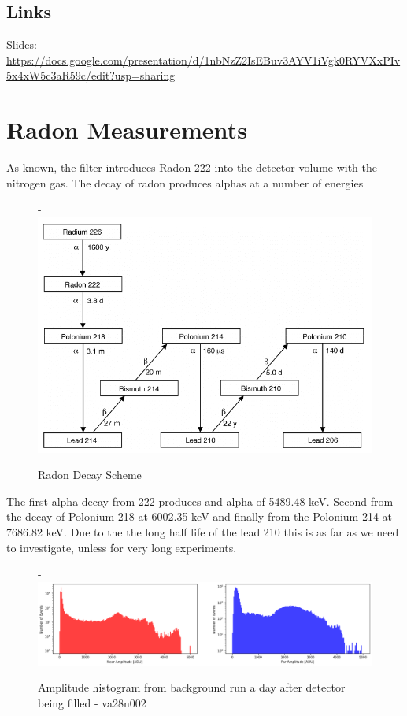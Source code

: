 \documentclass[a4paper]{article}
\begin{document}
\subsection{Links}
Slides: \url{https://docs.google.com/presentation/d/1nbNzZ2IsEBuv3AYV1iVgk0RYVXxPIv5x4xW5c3aR59c/edit?usp=sharing}
\section{Radon Measurements}
As known, the filter introduces Radon 222 into the detector volume with the nitrogen gas. The decay of radon produces alphas at a number of energies 
\begin{figure}[H]-
        \centering
        \includegraphics[width=1\linewidth]{Radon/radon.png}
        \caption{Radon Decay Scheme}
        \label{fig:south2d}
        \end{figure}
\noindent The first alpha decay from 222 produces and alpha of 5489.48 keV. Second from the decay of Polonium 218 at 6002.35 keV and finally from the Polonium 214 at 7686.82 keV. Due to the the long half life of the lead 210 this is as far as we need to investigate, unless for very long experiments.
\begin{figure}[H]-
        \centering
        \includegraphics[width=1\linewidth]{Radon/va28n002_ampbefore.png}
        \caption{Amplitude histogram from background run a day after detector being filled - va28n002}
        \label{fig:south2d}
        \end{figure}
\end{document}
